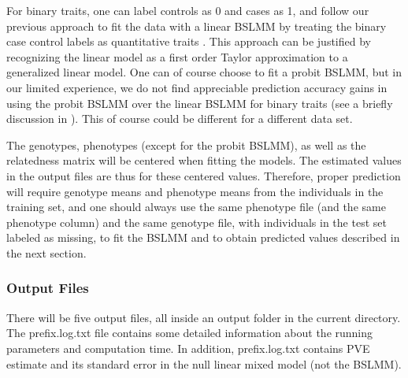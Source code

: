 \documentclass[11pt]{article}
\begin{document}
For binary traits, one can label controls as 0 and cases as 1, and
follow our previous approach to fit the data with a linear BSLMM by
treating the binary case control labels as quantitative traits
\cite{Zhou:2013}. This approach can be justified by recognizing the
linear model as a first order Taylor approximation to a generalized
linear model. One can of course choose to fit a probit BSLMM, but in
our limited experience, we do not find appreciable prediction accuracy
gains in using the probit BSLMM over the linear BSLMM for binary
traits (see a briefly discussion in \cite{Zhou:2013}). This of course
could be different for a different data set.

The genotypes, phenotypes (except for the probit BSLMM), as well as
the relatedness matrix will be centered when fitting the models. The
estimated values in the output files are thus for these centered
values. Therefore, proper prediction will require genotype means and
phenotype means from the individuals in the training set, and one
should always use the same phenotype file (and the same phenotype
column) and the same genotype file, with individuals in the test set
labeled as missing, to fit the BSLMM and to obtain predicted values
described in the next section.

\subsubsection{Output Files}

There will be five output files, all inside an output folder in the
current directory. The prefix.log.txt file contains some detailed
information about the running parameters and computation time. In
addition, prefix.log.txt contains PVE estimate and its standard error
in the null linear mixed model (not the BSLMM).
\end{document}
